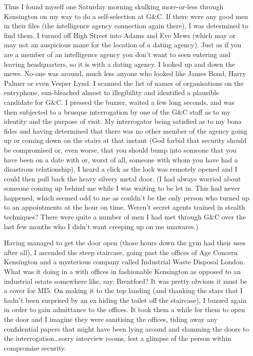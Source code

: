 Thus I found myself one Saturday morning skulking more-or-less
through Kensington on my way to do a self-selection at G{\&}C. If
there were any good men in their files (the intelligence agency connection again there), I was determined to find
them. I turned off High Street into Adams and Eve Mews (which may or
may not an auspicious name for the location of a dating agency).
Just as if you are a member of an intelligence agency you don't want
to seen entering and leaving headquarters, so it is with a dating
agency. I looked up and down the mews. No-one was around, much less
anyone who looked like James Bond, Harry Palmer or even Vesper Lynd.
I scanned the list of names of organisations on the entryphone,
sun-bleached almost to illegibility and identified a plausible
candidate for G{\&}C. I pressed the buzzer, waited a few long
seconds, and was then subjected to a brusque interrogation by one of
the G{\&}C staff as to my identity and the purpose of visit. My
interrogator being satisfied as to my {\twelveit bona fides\/} and
having determined that there was no other member of the agency going
up or coming down on the stairs at that instant (God forbid that
security should be compromised or, even worse, that you should bump
into someone that you have been on a date with or, worst of all,
someone with whom you have had a disastrous relationship), I heard a
click as the lock was remotely opened and I could then pull back the
heavy silvery metal door. (I had always worried about someone coming
up behind me while I was waiting to be let in. This had never
happened, which seemed odd to me as couldn't be the only person who
turned up to an appointments at the hour on time. Weren't secret
agents trained in stealth techniques? There were quite a number of
men I had met through G{\&}C over the last few months who I didn't
want creeping up on me unawares.)

Having managed to get the door open (those hours down the gym had
their uses after all), I ascended the steep staircase, going past
the offices of Age Concern Kensington and a mysterious company
called Industrial Waste Disposal London. What was it doing in a with
offices in fashionable Kensington as opposed to an industrial estate
somewhere like, say, Brentford? It was pretty obvious it must be a cover for MI5. On
making it to the top landing (and thanking the stars that I hadn't
been surprised by an ex hiding the toilet off the staircase), I
buzzed again in order to gain admittance to the offices. It took
them a while for them to open the door and I imagine they were
sanitising the offices, tiding away any confidential papers that
might have been lying around and slamming the doors to the
interrogation\dots sorry interview rooms, lest a glimpse of the
person within compromise security.

